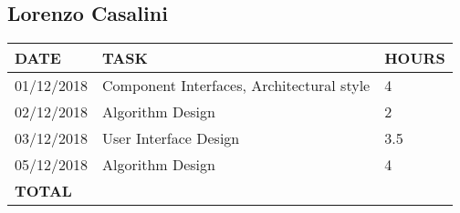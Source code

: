 \documentclass[12pt]{article}
\begin{document}
\subsection{Lorenzo Casalini}

\begin{center}
\begin{tabular}{ |p{}|p{}|p{}| } 
 \hline
 \textbf{DATE} & \textbf{TASK} & \textbf{HOURS} \\ 
  \hline
 01/12/2018 & Component Interfaces, Architectural style & 4\\
 \hline 
 02/12/2018 & Algorithm Design & 2 \\
 \hline
 03/12/2018 & User Interface Design & 3.5\\ 
 \hline 
 05/12/2018 & Algorithm Design & 4\\
  
  \hline
  \textbf{TOTAL} & \multicolumn{2}{c|}{} \\ 
  \hline
\end{tabular}
\end{center}
\end{document}
